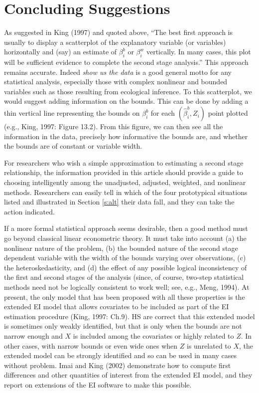 \documentclass[11pt,titlepage]{article}
\begin{document}
\section{Concluding Suggestions}

As suggested in King (1997) and quoted above, ``The best first
approach is usually to display a scatterplot of the explanatory
variable (or variables) horizontally and (say) an estimate of
$\beta_i^b$ or $\beta_i^w$ vertically.  In many cases, this plot will
be sufficient evidence to complete the second stage analysis.''  This
approach remains accurate.  Indeed \emph{show us the data} is a good
general motto for any statistical analysis, especially those with
complex nonlinear and bounded variables such as those resulting from
ecological inference.  To this scatterplot, we would suggest adding
information on the bounds.  This can be done by adding a thin vertical
line representing the bounds on $\beta_i^b$ for each
$(\hat\beta_i^b,Z_i)$ point plotted (e.g., King, 1997: Figure 13.2).
From this figure, we can then see all the information in the data,
precisely how informative the bounds are, and whether the bounds are
of constant or variable width.

For researchers who wish a simple approximation to estimating a second
stage relationship, the information provided in this article should
provide a guide to choosing intelligently among the unadjusted,
adjusted, weighted, and nonlinear methods.  Researchers can easily tell
in which of the four prototypical situations listed and illustrated in
Section \ref{s:alt} their data fall, and they can take the action
indicated.

If a more formal statistical approach seems desirable, then a good
method must go beyond classical linear econometric theory.  It must
take into account (a) the nonlinear nature of the problem, (b) the
bounded nature of the second stage dependent variable with the width
of the bounds varying over observations, (c) the heteroskedasticity,
and (d) the effect of any possible logical inconsistency of the first
and second stages of the analysis (since, of course, two-step
statistical methods need not be logically consistent to work well;
see, e.g., Meng, 1994).  At present, the only model that has been
proposed with all these properties is the extended EI model that
allows covariates to be included as part of the EI estimation
procedure (King, 1997: Ch.9).  HS are correct that this extended model
is sometimes only weakly identified, but that is only when the bounds
are not narrow enough and $X$ is included among the covariates or
highly related to $Z$.  In other cases, with narrow bounds or even
wide ones when $Z$ is unrelated to $X$, the extended model can be
strongly identified and so can be used in many cases without problem.
Imai and King (2002) demonstrate how to compute first differences and
other quantities of interest from the extended EI model, and they
report on extensions of the EI software to make this possible.
\end{document}
